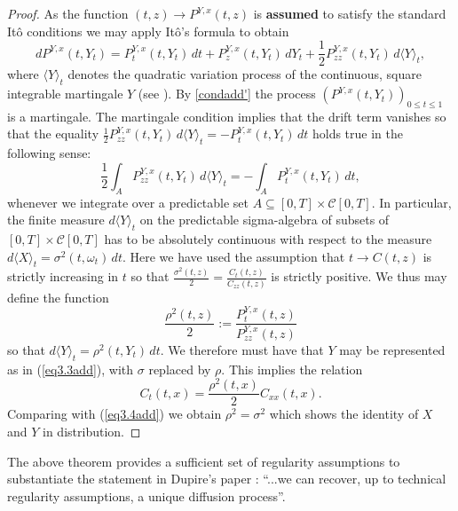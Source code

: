 \documentclass[11pt,a4paper]{article}%
\numberwithin{equation}{section}
\begin{document}
\begin{proof}
As the function $(t,z) \to P^{Y,x}(t,z)$ is {\bf assumed} to satisfy the standard It\^o conditions we may apply It\^o's  formula to obtain
\begin{equation}\label{Ito}
dP^{Y,x}(t,Y_t) = P_t^{Y,x}(t,Y_t) \, dt  + P_z^{Y,x}(t,Y_t)\, dY_t + \frac{1}{2} P_{zz}^{Y,x}(t,Y_t)\, d\langle Y {\rangle}_t,
\end{equation}
where $\langle Y {\rangle}_t$ denotes the quadratic variation process of the continuous, square integrable martingale $Y$ (see 
\cite[Theorem 7.6.4]{Ku06}).
By \eqref{condadd'} the process $(P^{Y,x}(t,Y_t))_{0 \le t \le 1}$ is a martingale. The martingale condition implies that the drift term vanishes so that the equality $\frac{1}{2} P_{zz}^{Y,x}(t,Y_t) \, d\langle Y {\rangle}_t = - P_t^{Y,x}(t,Y_t)\, dt$ holds true in the following sense:
\begin{equation}\label{mart}
\frac{1}{2} \int_A  P_{zz}^{Y,x}(t,Y_t)\, d\langle Y {\rangle}_t = - \int_A P_t^{Y,x}(t,Y_t)\, dt,
\end{equation}
whenever we integrate over a predictable set $A \subseteq [0,T] \times \mathcal C[0,T]$. In particular, the finite measure $d\langle Y {\rangle}_t$ on the predictable sigma-algebra of subsets of $[0,T] \times \mathcal C[0,T]$ has to be absolutely continuous with respect to the measure $d\langle X {\rangle}_t = \sigma^2(t,\omega_t)\, dt$. Here we have used the assumption that $t \to C(t,z)$ is strictly increasing in $t$ so  that $\frac{\sigma^2(t,z)}{2} =  \frac{C_t(t,z)}{ C_{zz}(t,z)}$ is strictly positive. We thus may define the function 
\[ \frac{\rho^2 (t,z)}{2} := \frac{P_t^{Y,x}(t,z)}{P_{zz}^{Y,x}(t,z)} \]
so that 
$d\langle Y {\rangle}_t =  \rho^2 (t,Y_t) \, dt$. 
We therefore must have that $Y$ may be represented as in (\ref{eq3.3add}), with $\sigma$ replaced by $\rho$. This implies the relation
\begin{equation}\label{forw}
 C_t(t,x) = \frac{\rho^2(t,x)}{2} { C_{xx}(t,x)} .
 \end{equation}
Comparing with (\ref{eq3.4add}) we obtain $\rho^2 = \sigma^2$ which shows the identity of $X$ and $Y$ in distribution.
\end{proof}




The above theorem provides a sufficient set of regularity assumptions to substantiate the statement in Dupire's paper \cite{Du94}: ``...we can recover, up to technical regularity  assumptions,  a  unique  diffusion  process''.
\end{document}
